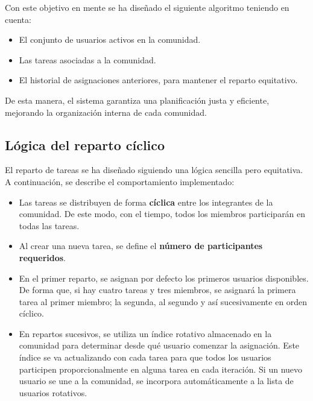 Con este objetivo en mente se ha diseñado el siguiente algoritmo teniendo en cuenta:
\begin{itemize}
  \item El conjunto de usuarios activos en la comunidad.
  \item Las tareas asociadas a la comunidad.
  \item El historial de asignaciones anteriores, para mantener el reparto equitativo.
\end{itemize}

De esta manera, el sistema garantiza una planificación justa y eficiente, mejorando la organización interna de cada comunidad.

\subsection*{Lógica del reparto cíclico}

El reparto de tareas se ha diseñado siguiendo una lógica sencilla pero equitativa. A continuación, se describe el comportamiento implementado:

\begin{itemize}
    \item Las tareas se distribuyen de forma \textbf{cíclica} entre los integrantes de la comunidad. De este modo, con el tiempo, todos los miembros participarán en todas las tareas.
    \item Al crear una nueva tarea, se define el \textbf{número de participantes requeridos}.
    \item En el primer reparto, se asignan por defecto los primeros usuarios disponibles. De forma que, si hay cuatro tareas y tres miembros, se asignará la primera tarea al primer miembro; la segunda, al segundo y así sucesivamente en orden cíclico.
    \item En repartos sucesivos, se utiliza un índice rotativo almacenado en la comunidad para determinar desde qué usuario comenzar la asignación. Este índice se va actualizando con cada tarea para que todos los usuarios participen proporcionalmente en alguna tarea en cada iteración. Si un nuevo usuario se une a la comunidad, se incorpora automáticamente a la lista de usuarios rotativos.
\end{itemize}


